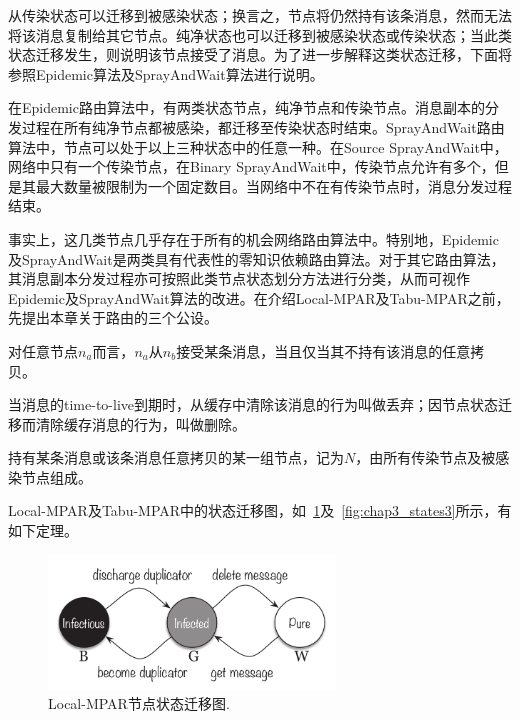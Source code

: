 从传染状态可以迁移到被感染状态；换言之，节点将仍然持有该条消息，然而无法将该消息复制给其它节点。纯净状态也可以迁移到被感染状态或传染状态；当此类状态迁移发生，则说明该节点接受了消息。为了进一步解释这类状态迁移，下面将参照Epidemic算法\cite{Vahdat2000}及SprayAndWait算法\cite{Spyropoulos2005}进行说明。

在Epidemic路由算法中，有两类状态节点，纯净节点和传染节点。消息副本的分发过程在所有纯净节点都被感染，都迁移至传染状态时结束。SprayAndWait路由算法中，节点可以处于以上三种状态中的任意一种。在Source SprayAndWait中，网络中只有一个传染节点，在Binary SprayAndWait中，传染节点允许有多个，但是其最大数量被限制为一个固定数目。当网络中不在有传染节点时，消息分发过程结束。

事实上，这几类节点几乎存在于所有的机会网络路由算法中。特别地，Epidemic及SprayAndWait是两类具有代表性的零知识依赖路由算法。对于其它路由算法，其消息副本分发过程亦可按照此类节点状态划分方法进行分类，从而可视作Epidemic及SprayAndWait算法的改进。在介绍Local-MPAR及Tabu-MPAR之前，先提出本章关于路由的三个公设。

\begin{postulation}
\label{post:replication}
对任意节点$n_a$而言，$n_a$从$n_b$接受某条消息，当且仅当其不持有该消息的任意拷贝。
\end{postulation}

\begin{postulation}
\label{post:deletion}
当消息的time-to-live到期时，从缓存中清除该消息的行为叫做丢弃；因节点状态迁移而清除缓存消息的行为，叫做删除。
\end{postulation}

\begin{postulation}
持有某条消息或该条消息任意拷贝的某一组节点，记为$N$，由所有传染节点及被感染节点组成。
\end{postulation}

Local-MPAR及Tabu-MPAR中的状态迁移图，如\figurename~\ref{fig:chap3_states2}及\figurename~\ref{fig:chap3_states3}所示，有如下定理。

\begin{figure}[!t]
\centering
\includegraphics[width=3in]{paper-MPAR/states2}
\caption{Local-MPAR节点状态迁移图.}
\label{fig:chap3_states2}
\end{figure}


